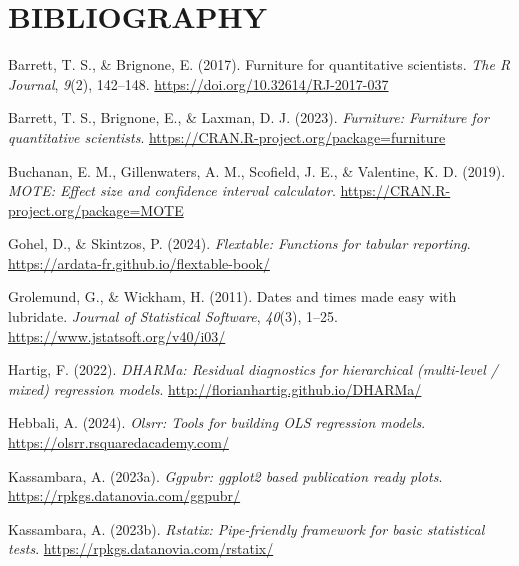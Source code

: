 \documentclass[
]{article}
\newlength{\cslhangindent}
\newlength{\cslentryspacingunit} %
\newenvironment{CSLReferences}[2] %
 {%
  \setlength{\parindent}{0pt}
  \ifodd #1
  \let\oldpar\par
  \def\par{\hangindent=\cslhangindent\oldpar}
  \fi
  \setlength{\parskip}{#2\cslentryspacingunit}
 }%
 {}
\begin{document}
\clearpage

\hypertarget{bibliography}{%
\section{BIBLIOGRAPHY}\label{bibliography}}

\doublespacing

\hypertarget{refs}{}
\begin{CSLReferences}{1}{0}
\leavevmode{}%
Barrett, T. S., \& Brignone, E. (2017). Furniture for quantitative
scientists. \emph{The R Journal}, \emph{9}(2), 142--148.
\url{https://doi.org/10.32614/RJ-2017-037}

\leavevmode{}%
Barrett, T. S., Brignone, E., \& Laxman, D. J. (2023). \emph{Furniture:
Furniture for quantitative scientists}.
\url{https://CRAN.R-project.org/package=furniture}

\leavevmode{}%
Buchanan, E. M., Gillenwaters, A. M., Scofield, J. E., \& Valentine, K.
D. (2019). \emph{MOTE: Effect size and confidence interval calculator}.
\url{https://CRAN.R-project.org/package=MOTE}

\leavevmode{}%
Gohel, D., \& Skintzos, P. (2024). \emph{Flextable: Functions for
tabular reporting}. \url{https://ardata-fr.github.io/flextable-book/}

\leavevmode{}%
Grolemund, G., \& Wickham, H. (2011). Dates and times made easy with
{lubridate}. \emph{Journal of Statistical Software}, \emph{40}(3),
1--25. \url{https://www.jstatsoft.org/v40/i03/}

\leavevmode{}%
Hartig, F. (2022). \emph{DHARMa: Residual diagnostics for hierarchical
(multi-level / mixed) regression models}.
\url{http://florianhartig.github.io/DHARMa/}

\leavevmode{}%
Hebbali, A. (2024). \emph{Olsrr: Tools for building OLS regression
models}. \url{https://olsrr.rsquaredacademy.com/}

\leavevmode{}%
Kassambara, A. (2023a). \emph{Ggpubr: ggplot2 based publication ready
plots}. \url{https://rpkgs.datanovia.com/ggpubr/}

\leavevmode{}%
Kassambara, A. (2023b). \emph{Rstatix: Pipe-friendly framework for basic
statistical tests}. \url{https://rpkgs.datanovia.com/rstatix/}


\end{CSLReferences}
\end{document}

